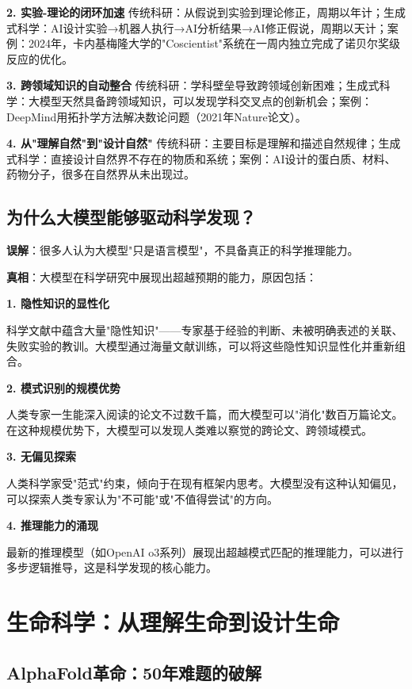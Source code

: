 \textbf{2. 实验-理论的闭环加速}
传统科研：从假说到实验到理论修正，周期以年计；生成式科学：AI设计实验→机器人执行→AI分析结果→AI修正假说，周期以天计；案例：2024年，卡内基梅隆大学的"Coscientist"系统在一周内独立完成了诺贝尔奖级反应的优化。

\textbf{3. 跨领域知识的自动整合}
传统科研：学科壁垒导致跨领域创新困难；生成式科学：大模型天然具备跨领域知识，可以发现学科交叉点的创新机会；案例：DeepMind用拓扑学方法解决数论问题（2021年Nature论文）。

\textbf{4. 从"理解自然"到"设计自然"}
传统科研：主要目标是理解和描述自然规律；生成式科学：直接设计自然界不存在的物质和系统；案例：AI设计的蛋白质、材料、药物分子，很多在自然界从未出现过。

\subsection{为什么大模型能够驱动科学发现？}

\textbf{误解}：很多人认为大模型"只是语言模型"，不具备真正的科学推理能力。

\textbf{真相}：大模型在科学研究中展现出超越预期的能力，原因包括：

\textbf{1. 隐性知识的显性化}

科学文献中蕴含大量"隐性知识"——专家基于经验的判断、未被明确表述的关联、失败实验的教训。大模型通过海量文献训练，可以将这些隐性知识显性化并重新组合。

\textbf{2. 模式识别的规模优势}

人类专家一生能深入阅读的论文不过数千篇，而大模型可以"消化"数百万篇论文。在这种规模优势下，大模型可以发现人类难以察觉的跨论文、跨领域模式。

\textbf{3. 无偏见探索}

人类科学家受"范式"约束，倾向于在现有框架内思考。大模型没有这种认知偏见，可以探索人类专家认为"不可能"或"不值得尝试"的方向。

\textbf{4. 推理能力的涌现}

最新的推理模型（如OpenAI o3系列）展现出超越模式匹配的推理能力，可以进行多步逻辑推导，这是科学发现的核心能力。

\section{生命科学：从理解生命到设计生命}

\subsection{AlphaFold革命：50年难题的破解}

